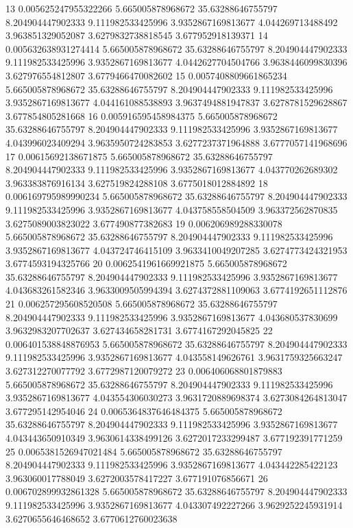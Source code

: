 {13 0.005625247955322266 5.665005878968672 35.63288646755797 8.204904447902333 9.111982533425996 3.9352867169813677 4.044269713488492 3.963851329052087 3.6279832738818545 3.677952918139371
14 0.005632638931274414 5.665005878968672 35.63288646755797 8.204904447902333 9.111982533425996 3.9352867169813677 4.0442627704504766 3.9638446099830396 3.627976554812807 3.6779466470082602
15 0.0057408809661865234 5.665005878968672 35.63288646755797 8.204904447902333 9.111982533425996 3.9352867169813677 4.044161088538893 3.9637494881947837 3.6278781529628867 3.677854805281668
16 0.005916595458984375 5.665005878968672 35.63288646755797 8.204904447902333 9.111982533425996 3.9352867169813677 4.043996023409294 3.9635950724283853 3.6277237371964888 3.6777057141968696
17 0.00615692138671875 5.665005878968672 35.63288646755797 8.204904447902333 9.111982533425996 3.9352867169813677 4.043770262689302 3.963383876916134 3.627519824288108 3.6775018012884892
18 0.006169795989990234 5.665005878968672 35.63288646755797 8.204904447902333 9.111982533425996 3.9352867169813677 4.043758558504509 3.963372562870835 3.6275089003823022 3.677490877382683
19 0.006206989288330078 5.665005878968672 35.63288646755797 8.204904447902333 9.111982533425996 3.9352867169813677 4.043724746415109 3.9633410049207285 3.6274773424321953 3.6774593194325766
20 0.0062541961669921875 5.665005878968672 35.63288646755797 8.204904447902333 9.111982533425996 3.9352867169813677 4.043683261582346 3.9633009505994394 3.6274372881109063 3.6774192651112876
21 0.006257295608520508 5.665005878968672 35.63288646755797 8.204904447902333 9.111982533425996 3.9352867169813677 4.043680537830699 3.9632983207702637 3.627434658281731 3.6774167292045825
22 0.006401538848876953 5.665005878968672 35.63288646755797 8.204904447902333 9.111982533425996 3.9352867169813677 4.043558149626761 3.9631759325663247 3.627312270077792 3.6772987120079272
23 0.006406068801879883 5.665005878968672 35.63288646755797 8.204904447902333 9.111982533425996 3.9352867169813677 4.043554306030273 3.9631720889698374 3.6273084264813047 3.677295142954046
24 0.0065364837646484375 5.665005878968672 35.63288646755797 8.204904447902333 9.111982533425996 3.9352867169813677 4.043443650910349 3.9630614338499126 3.6272017233299487 3.677192391771259
25 0.0065381526947021484 5.665005878968672 35.63288646755797 8.204904447902333 9.111982533425996 3.9352867169813677 4.043442285422123 3.963060017788049 3.6272003578417227 3.677191076856671
26 0.006702899932861328 5.665005878968672 35.63288646755797 8.204904447902333 9.111982533425996 3.9352867169813677 4.043307492227266 3.9629252245931914 3.6270655646468652 3.6770612760023638
}
